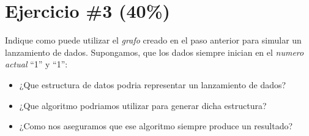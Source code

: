 \documentclass{article}
\begin{document}
\section*{Ejercicio \#3 (40\%)}
Indique como puede utilizar el \emph{grafo} creado en el paso anterior para simular
un lanzamiento de dados. Supongamos, que los dados siempre inician en el \emph{numero actual}
``1'' y ``1'':
\begin{itemize}
        \item{¿Que estructura de datos podria representar un lanzamiento de dados?}
        \item{¿Que algoritmo podriamos utilizar para generar dicha estructura?}
        \item{¿Como nos aseguramos que ese algoritmo siempre produce un resultado?}
\end{itemize}
\end{document}
